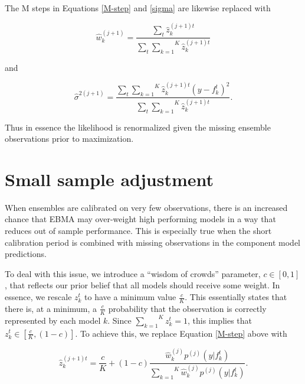 \documentclass[12pt,fullpage,endnotes]{article}
\begin{document}
\noindent  The M steps in Equations \ref{M-step} and \ref{sigma} are likewise replaced with

\begin{equation}
\hat{w}^{(j+1)}_k=\frac{\underset{t}{\sum}\hat{z}^{(j+1)t}_{k}}{\underset{t}{\sum}\overset{K}{\underset{k=1}{ \sum}} \hat{z}_k^{(j+1)t}}
\end{equation}


\noindent and

\begin{equation}
\hat{\sigma}^{2(j+1)}=\frac{\underset{t}{\sum}\overset{K}{\underset{k=1}{\sum}}\hat{z}^{(j+1)t}_{k}(y-f_{k}^{t})^2 }{\underset{t}{\sum}\overset{K}{\underset{k=1}{ \sum}} \hat{z}_k^{(j+1)t}}.
\end{equation}

Thus in essence the likelihood is renormalized given the missing ensemble observations prior to maximization.   

\section{Small sample adjustment}
\label{woc}

When ensembles are calibrated on very few observations, there is an
increased chance that EBMA may over-weight high performing models in a
way that reduces out of sample performance. This is especially true when the short calibration period is combined with missing observations in the component model predictions. %

To deal with this issue, we introduce a ``wisdom of crowds'' parameter, $c \in [0,1]$, that reflects our prior
belief that all models should receive some weight.  In essence, we
rescale $z^t_k$ to have a minimum value $\frac{c}{K}$.  This
essentially states that there is, at a minimum, a $\frac{c}{K}$
probability that the observation is correctly represented by each
model $k$.  Since $\overset{K}{\underset{k=1}{\sum}} z_k^t = 1$, this
implies that $z_k^t \in [\frac{c}{K}, (1-c)]$.  To achieve this, we
replace Equation \ref{M-step} above with

\begin{equation}
\hat{z}^{(j+1)t}_{k} = \frac{c}{K} + (1-c)\frac{\hat{w}^{(j)}_k
p^{(j)}(y|f_{k}^{t})}{\overset{K}{\underset{k=1}{\sum}}\hat{w}^{(j)}_kp^{(j)}(y|f_{k}^{t})}.
\end{equation}
\end{document}
